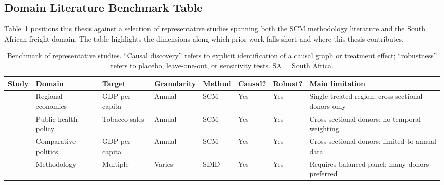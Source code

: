 \subsection{Domain Literature Benchmark Table}
\label{sec:benchmark}

Table~\ref{tab:benchmark} positions this thesis against a selection
of representative studies spanning both the SCM methodology literature
and the South African freight domain.
The table highlights the dimensions along which prior work falls short
and where this thesis contributes.

\begin{table}[H]
  \centering
  \caption{Benchmark of representative studies. ``Causal discovery''
    refers to explicit identification of a causal graph or treatment
    effect; ``robustness'' refers to placebo, leave-one-out, or
    sensitivity tests. SA = South Africa.}
  \label{tab:benchmark}
  \small
  \renewcommand{\arraystretch}{1.35}
  \begin{tabularx}{\textwidth}{%
      >{\raggedright\arraybackslash}p{3.2cm}   %
      >{\raggedright\arraybackslash}p{2.0cm}   %
      >{\raggedright\arraybackslash}p{1.5cm}   %
      >{\raggedright\arraybackslash}p{1.3cm}   %
      >{\raggedright\arraybackslash}p{1.5cm}   %
      >{\centering\arraybackslash}p{1.1cm}     %
      >{\centering\arraybackslash}p{1.3cm}     %
      >{\raggedright\arraybackslash}p{2.5cm}   %
    }
    \toprule
    \textbf{Study} &
    \textbf{Domain} &
    \textbf{Target} &
    \textbf{Granularity} &
    \textbf{Method} &
    \textbf{Causal?} &
    \textbf{Robust?} &
    \textbf{Main limitation} \\
    \midrule
    \textcite{abadie2003} &
    Regional economics &
    GDP per capita &
    Annual &
    SCM &
    Yes &
    Yes &
    Single treated region; cross-sectional donors only \\

    \textcite{abadie2010} &
    Public health policy &
    Tobacco sales &
    Annual &
    SCM &
    Yes &
    Yes &
    Cross-sectional donors; no temporal weighting \\

    \textcite{abadie2015} &
    Comparative politics &
    GDP per capita &
    Annual &
    SCM &
    Yes &
    Yes &
    Cross-sectional donors; limited to annual data \\

    \textcite{arkhangelsky2021} &
    Methodology &
    Multiple &
    Varies &
    SDID &
    Yes &
    Yes &
    Requires balanced panel; many donors preferred \\


\end{tabularx}
\end{table}
